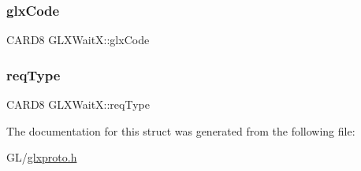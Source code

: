 \mbox{\label{struct_g_l_x_wait_x_ad4d5e935ebb8bb3a8ecaff0ec47f88bc}} 
\subsubsection{\texorpdfstring{glx\+Code}{glxCode}}
{\footnotesize\ttfamily C\+A\+R\+D8 G\+L\+X\+Wait\+X\+::glx\+Code}

\mbox{\label{struct_g_l_x_wait_x_ad11b3b26e66094e37c4d41d280e6d7b9}} 
\subsubsection{\texorpdfstring{req\+Type}{reqType}}
{\footnotesize\ttfamily C\+A\+R\+D8 G\+L\+X\+Wait\+X\+::req\+Type}



The documentation for this struct was generated from the following file\+:\begin{DoxyCompactItemize}
\item 
G\+L/\hyperlink{glxproto_8h}{glxproto.\+h}\end{DoxyCompactItemize}
